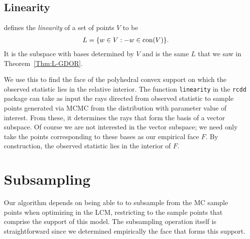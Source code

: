 \subsection{Linearity}\label{S:linearity}
\citet{Geyer:gdor} defines the \emph{linearity} of a set of points $V$ to be
\begin{align*}
	L = \{ w \in V: -w \in \operatorname{con}( V ) \}.
\end{align*}
It is the subspace with bases determined by $V$ and is the same $L$ that we saw 
in Theorem~\ref{Thm:L-GDOR}.

We use this to find the face of the polyhedral convex support on which the observed 
statistic lies in the relative interior.  The function \texttt{linearity} in the \texttt
{rcdd} package can take as input the rays directed from observed statistic to sample 
points generated via MCMC from the distribution with parameter value of interest.  
From these, it determines the rays that form the basis of a vector subspace.  Of 
course we are not interested in the vector subspace; we need only take the points 
corresponding to these bases as our empirical face $F$.  By construction, the observed 
statistic lies in the interior of $F$.





\section{Subsampling}
Our algorithm depends on being able to to subsample from the MC sample points when 
optimizing in the LCM, restricting to the sample points that comprise the support of 
this model.  The subsampling operation itself is straightforward since we determined 
empirically the face that forms this support.  

